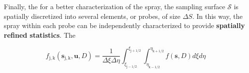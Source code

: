 Finally, the for a better characterization of the spray, the sampling surface $\mathcal{S}$ is spatially discretized into several elements, or probes, of size $\Delta S$. In this way, the spray within each probe can be independently characterized to provide \textbf{spatially refined statistics}. The 

\begin{equation}
\label{eg:f_discrete}
f_\mathrm{j,k} \left( \boldsymbol{s}_\mathrm{j,k}, \boldsymbol{u}, D \right) = \frac{1}{\Delta \xi \Delta \eta} \int_{\xi_\mathrm{j-1/2}}^{\xi_\mathrm{j+1/2}} \int_{\eta_\mathrm{k-1/2}}^{\eta_\mathrm{k+1/2}}  f \left( \boldsymbol{s}, D \right) d\xi d\eta
\end{equation}


%

%
%
%

